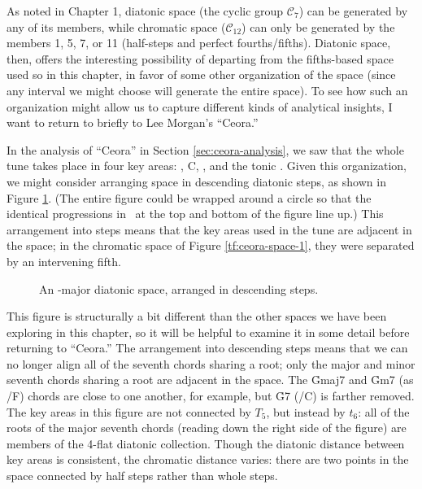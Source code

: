 As noted in Chapter 1, diatonic space (the cyclic group $\mathcal{C}_7$) can
be generated by any of its members, while chromatic space ($\mathcal{C}_{12}$)
can only be generated by the members 1, 5, 7, or 11 (half-steps and perfect
fourths/fifths). Diatonic \tf space, then, offers the interesting possibility
of departing from the fifths-based space used so in this chapter, in
favor of some other organization of the space (since any interval we might
choose will generate the entire space). To see how such an organization
might allow us to capture different kinds of analytical insights, I want to
return to briefly to Lee Morgan's ``Ceora.''

In the analysis of ``Ceora'' in Section \ref{sec:ceora-analysis}, we saw that
the whole tune takes place in four key areas: \Dflat, C, \Bflat, and the tonic
\Aflat. Given this organization, we might consider arranging \tf space in
descending diatonic steps, as shown in Figure \ref{tfe:ab-diatonic-space}.
(The entire figure could be wrapped around a circle so that the identical \tfo
progressions in \Aflat\ at the top and bottom of the figure line up.) This
arrangement into steps means that the key areas used in the tune are adjacent
in the space; in the chromatic space of Figure \ref{tf:ceora-space-1}, they
were separated by an intervening fifth.

\begin{figure}[tbp]
  \caption{An \Aflat{}-major diatonic \tf space, arranged in descending steps.}
  \label{tfe:ab-diatonic-space}
\end{figure}

This figure is structurally a bit different than the other spaces we have been
exploring in this chapter, so it will be helpful to examine it in some detail
before returning to ``Ceora.'' The arrangement into descending steps means
that we can no longer align all of the seventh chords sharing a root; only the
major and minor seventh chords sharing a root are adjacent in the
space. The \h{Gmaj7} and \h{Gm7} (as \ii/F) chords are close to
one another, for example, but \h{G7} (\V/C) is farther removed. The key
areas in this figure are not connected by $T_5$, but instead by $t_6$: all of
the roots of the major seventh chords (reading down the right side of the
figure) are members of the 4-flat diatonic collection. Though the
diatonic distance between key areas is consistent, the chromatic distance
varies: there are two points in the space connected by half steps rather than
whole steps.

